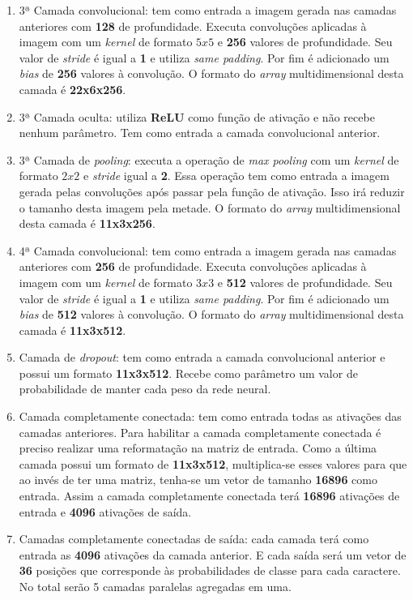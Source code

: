 \begin{enumerate}
\item 3ª Camada convolucional: tem como entrada a imagem gerada
  nas camadas anteriores com {\bf 128} de profundidade. Executa
  convoluções aplicadas à imagem com um \textit{kernel} de formato
  $5x5$ e {\bf 256} valores de profundidade. Seu valor de
  \textit{stride} é igual a {\bf 1} e utiliza \textit{same
    padding}. Por fim é adicionado um \textit{bias} de {\bf 256}
  valores à convolução. O formato do \textit{array} multidimensional desta
  camada é {\bf 22x6x256}.

\item 3ª Camada oculta: utiliza {\bf ReLU} como função de ativação e
  não recebe nenhum parâmetro. Tem como entrada a camada convolucional
  anterior.

\item 3ª Camada de \textit{pooling}: executa a operação de
  \textit{max pooling} com um \textit{kernel} de formato $2x2$ e
  \textit{stride} igual a {\bf 2}. Essa operação tem como entrada a
  imagem gerada pelas convoluções após passar pela função de
  ativação. Isso irá reduzir o tamanho desta imagem pela metade. O
  formato do \textit{array} multidimensional desta camada é {\bf 11x3x256}.

\item 4ª Camada convolucional: tem como entrada a imagem gerada
  nas camadas anteriores com {\bf 256} de profundidade. Executa
  convoluções aplicadas à imagem com um \textit{kernel} de formato
  $3x3$ e {\bf 512} valores de profundidade. Seu valor de
  \textit{stride} é igual a {\bf 1} e utiliza \textit{same
    padding}. Por fim é adicionado um \textit{bias} de {\bf 512}
  valores à convolução. O formato do \textit{array} multidimensional desta
  camada é {\bf 11x3x512}.

\item Camada de \textit{dropout}: tem como entrada a camada
  convolucional anterior e possui um formato {\bf 11x3x512}. Recebe
  como parâmetro um valor de probabilidade de manter cada peso da rede
  neural.

\item Camada completamente conectada: tem como entrada todas as
  ativações das camadas anteriores. Para habilitar a camada
  completamente conectada é preciso realizar uma reformatação na
  matriz de entrada. Como a última camada possui um formato de {\bf
    11x3x512}, multiplica-se esses valores para que ao invés de
  ter uma matriz, tenha-se um vetor de tamanho {\bf 16896} como
  entrada. Assim a camada completamente conectada terá {\bf 16896}
  ativações de entrada e {\bf 4096} ativações de saída.

\item Camadas completamente conectadas de saída: cada camada terá como
  entrada as {\bf 4096} ativações da camada anterior. E cada saída
  será um vetor de {\bf 36} posições que corresponde às probabilidades
  de classe para cada caractere. No total serão 5 camadas paralelas
  agregadas em uma.

\end{enumerate}

